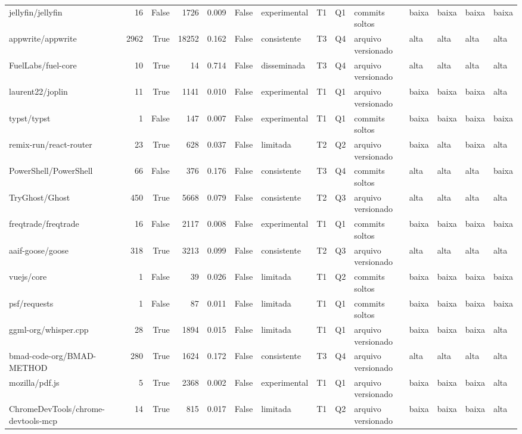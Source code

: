 \begin{tabular}{lrrrrrllllllll}
jellyfin/jellyfin & 16 & False & 1726 & 0.009 & False & experimental & T1 & Q1 & commits soltos & baixa & baixa & baixa & baixa \\
appwrite/appwrite & 2962 & True & 18252 & 0.162 & False & consistente & T3 & Q4 & arquivo versionado & alta & alta & alta & alta \\
FuelLabs/fuel-core & 10 & True & 14 & 0.714 & False & disseminada & T3 & Q4 & arquivo versionado & alta & alta & alta & alta \\
laurent22/joplin & 11 & True & 1141 & 0.010 & False & experimental & T1 & Q1 & arquivo versionado & baixa & baixa & baixa & alta \\
typst/typst & 1 & False & 147 & 0.007 & False & experimental & T1 & Q1 & commits soltos & baixa & baixa & baixa & baixa \\
remix-run/react-router & 23 & True & 628 & 0.037 & False & limitada & T2 & Q2 & arquivo versionado & baixa & alta & baixa & alta \\
PowerShell/PowerShell & 66 & False & 376 & 0.176 & False & consistente & T3 & Q4 & commits soltos & alta & alta & alta & baixa \\
TryGhost/Ghost & 450 & True & 5668 & 0.079 & False & consistente & T2 & Q3 & arquivo versionado & alta & alta & alta & alta \\
freqtrade/freqtrade & 16 & False & 2117 & 0.008 & False & experimental & T1 & Q1 & commits soltos & baixa & baixa & baixa & baixa \\
aaif-goose/goose & 318 & True & 3213 & 0.099 & False & consistente & T2 & Q3 & arquivo versionado & alta & alta & alta & alta \\
vuejs/core & 1 & False & 39 & 0.026 & False & limitada & T1 & Q2 & commits soltos & baixa & baixa & baixa & baixa \\
psf/requests & 1 & False & 87 & 0.011 & False & limitada & T1 & Q1 & commits soltos & baixa & baixa & baixa & baixa \\
ggml-org/whisper.cpp & 28 & True & 1894 & 0.015 & False & limitada & T1 & Q1 & arquivo versionado & baixa & baixa & baixa & alta \\
bmad-code-org/BMAD-METHOD & 280 & True & 1624 & 0.172 & False & consistente & T3 & Q4 & arquivo versionado & alta & alta & alta & alta \\
mozilla/pdf.js & 5 & True & 2368 & 0.002 & False & experimental & T1 & Q1 & arquivo versionado & baixa & baixa & baixa & alta \\
ChromeDevTools/chrome-devtools-mcp & 14 & True & 815 & 0.017 & False & limitada & T1 & Q2 & arquivo versionado & baixa & baixa & baixa & alta \\

\end{tabular}
